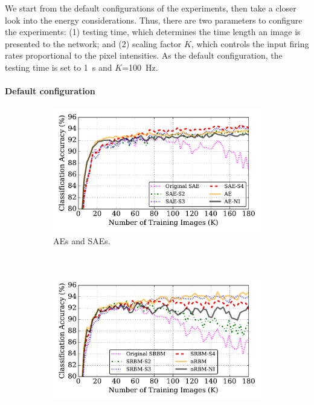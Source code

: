 We start from the default configurations of the experiments, then take a closer look into the energy considerations.
Thus, there are two parameters to configure the experiments: (1) testing time, which determines the time length an image is presented to the network; and (2) scaling factor $K$, which controls the input firing rates proportional to the pixel intensities.
As the default configuration, the testing time is set to 1~s and $K$=100~Hz.



\paragraph{Default configuration\\}

\begin{figure}
	\centering
	\begin{subfigure}[t]{0.8\textwidth}
		\includegraphics[width=\textwidth]{pics_sdlm/43_MNIST_SAE_all/compare_result.pdf}
		\caption{AEs and SAEs.}
	\end{subfigure}\\
	\begin{subfigure}[t]{0.8\textwidth}
		\includegraphics[width=\textwidth]{pics_sdlm/53_MNIST_SRBM_all/compare_result.pdf}

\end{subfigure}
\end{figure}
